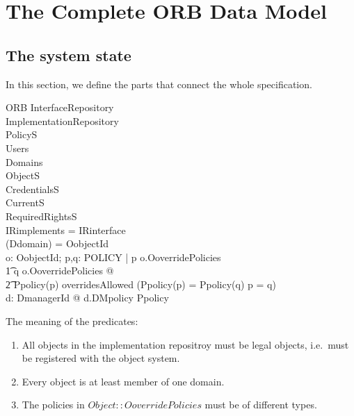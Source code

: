 
\section{The Complete ORB Data Model} \label{sec:ORB-model}

\vspace{2ex}

\subsection{The system state}
In this section, we define the parts that connect the whole specification.
\begin{schema}{ORB}
  InterfaceRepository \\
  ImplementationRepository \\
  PolicyS \\
  Users \\
  Domains \\
  ObjectS \\
  CredentialsS \\
  CurrentS \\
  RequiredRightsS \\
  \where
  \ran IRimplements = \dom IRinterface \\
  \bigcup (\ran Ddomain) = \dom OobjectId \\
  \forall o: \ran OobjectId; p,q: POLICY | p \in o.OoverridePolicies \land \\
  \t1 q \in o.OoverridePolicies @ \\
  \t2 Ppolicy(p) \in overridesAllowed \land (Ppolicy(p) = Ppolicy(q) \implies p
  = q) \\

  \forall d: \ran DmanagerId @ \ran d.DMpolicy \subseteq \dom Ppolicy \\
\end{schema}
The meaning of the predicates:
\begin{enumerate}
\item All objects in the implementation repositroy must be legal objects, i.e.\
  must be registered with the object system.
\item Every object is at least member of one domain.
\item The policies in $Object::OoverridePolicies$ must be of different types.
\end{enumerate}


